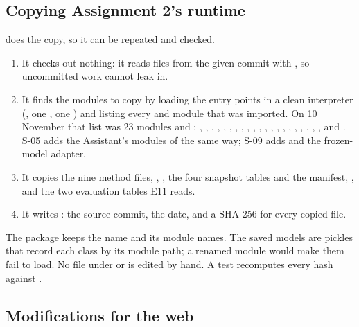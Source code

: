 \subsection{Copying Assignment 2's runtime}
\label{sec:vendoring}

 does the copy, so it can be repeated
and checked.

\begin{enumerate}
  \item It checks out nothing: it reads files from the given commit with , so
    uncommitted work cannot leak in.
  \item It finds the modules to copy by loading the entry points in a clean interpreter
    (, one , one ) and listing every
     and  module that was imported. On 10 November that list was 23
     modules and : , ,
    , , , , ,
    , , , , ,
    , , , , ,
    , , , ,  and
    . S-05 adds the Assistant's modules of  the same way; S-09 adds
     and the frozen-model adapter.
  \item It copies the nine method files, , , the four
    snapshot tables and the manifest, , and the two evaluation tables E11
    reads.
  \item It writes : the source commit, the date, and a SHA-256 for every
    copied file.
\end{enumerate}

\begin{caution}
The package keeps the name  and its module names. The saved models are pickles that
record each class by its module path; a renamed module would make them fail to load. No file under
 or  is edited by hand. A test recomputes every hash against
.
\end{caution}

\subsection{Modifications for the web}
\label{sec:mods}

